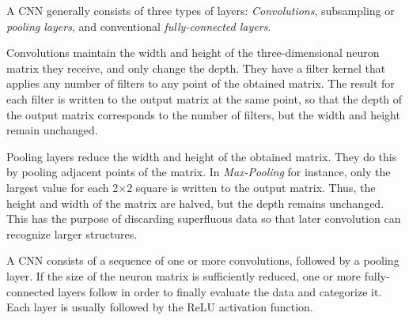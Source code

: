 A CNN generally consists of three types of layers: \textit{Convolutions}, subsampling or
\textit{pooling layers}, and conventional \textit{fully-connected layers}.

Convolutions maintain the width and height of the three-dimensional neuron
matrix they receive, and only change the depth. They have a filter kernel that
applies any number of filters to any point of the obtained matrix. The result
for each filter is written to the output matrix at the same point, so that the
depth of the output matrix corresponds to the number of filters, but the width
and height remain unchanged.

Pooling layers reduce the width and height of the obtained matrix. They do this
by pooling adjacent points of the matrix. In \textit{Max-Pooling} for instance,
only the largest value for each 2×2 square is written to the output matrix.
Thus, the height and width of the matrix are halved, but the depth remains
unchanged. This has the purpose of discarding superfluous data so that later
convolution can recognize larger structures.

A CNN consists of a sequence of one or more convolutions, followed by a pooling
layer. If the size of the neuron matrix is sufficiently reduced, one or more
fully-connected layers follow in order to finally evaluate the data and
categorize it. Each layer is usually followed by the ReLU activation function. 
